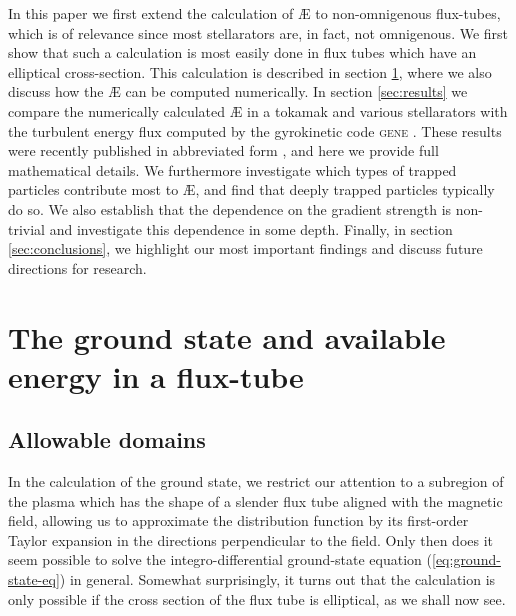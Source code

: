     In this paper we first extend the calculation of \AE{} to non-omnigenous flux-tubes, which is of relevance since most stellarators are, in fact, not omnigenous. We first show that such a calculation is most easily done in flux tubes which have an elliptical cross-section. This calculation is described in section \ref{sec:theory}, where we also discuss how the \AE{} can be computed numerically. In section \ref{sec:results} we compare the numerically calculated \AE{} in a tokamak and various stellarators with the turbulent energy flux computed by the gyrokinetic code \textsc{gene} \citep{Jenko2000ElectronTurbulence}. These results were recently published in abbreviated form \citep{Mackenbach2022AvailableTransport}, and here we provide full mathematical details. We furthermore investigate which types of trapped particles contribute most to \AE{}, and find that deeply trapped particles typically do so. We also establish that the dependence on the gradient strength is non-trivial and investigate this dependence in some depth. Finally, in section \ref{sec:conclusions}, we highlight our most important findings and discuss future directions for research. 
 
\section{The ground state and available energy in a flux-tube} \label{sec:theory}
\subsection{Allowable domains}
In the calculation of the ground state, we restrict our attention to a subregion of the plasma which has the shape of a slender flux tube aligned with the magnetic field, allowing us to approximate the distribution function by its first-order Taylor expansion in the directions perpendicular to the field. Only then does it seem possible to solve the integro-differential ground-state equation (\ref{eq:ground-state-eq}) in general. Somewhat surprisingly, it turns out that the calculation is only possible if the cross section of the flux tube is elliptical, as we shall now see. 

